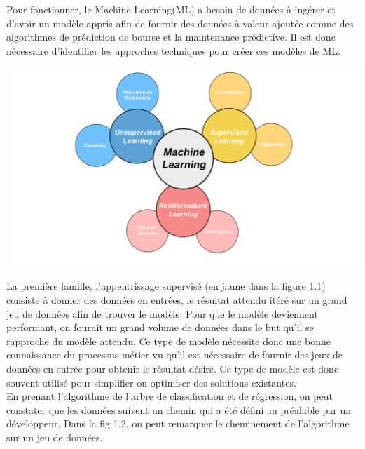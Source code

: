\documentclass[12pt,a4paper]{report}
\begin{document}
Pour fonctionner, le Machine Learning(ML) a besoin de données à ingérer et d'avoir un modèle appris afin de fournir des données à valeur ajoutée comme des algorithmes de prédiction de bourse et la maintenance prédictive. Il est donc nécessaire d'identifier les approches techniques pour créer ces modèles de ML.\\

\begin{center}
	\includegraphics[scale=0.2]{ML_vignette}
	\label{fig1}
\end{center}

La première famille, l'appentrissage supervisé (en jaune dans la figure 1.1) consiste à donner des données en entrées, le résultat attendu itéré sur un grand jeu de données afin de trouver le modèle. Pour que le modèle deviennent performant, on fournit un grand volume de données dans le but qu'il se rapproche du modèle attendu. Ce type de modèle nécessite donc une bonne connaissance du processus métier vu qu'il est nécessaire de fournir des jeux de données en entrée pour obtenir le résultat désiré. Ce type de modèle est donc souvent utilisé pour simplifier ou optimiser des solutions existantes.\\

En prenant l'algorithme de l'arbre de classification et de régression, on peut constater que les données suivent un chemin qui a été défini au préalable par un développeur. Dans la fig 1.2, on peut remarquer le cheminement de l'algorithme sur un jeu de données.
\end{document}
